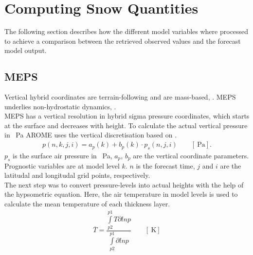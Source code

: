 \section{Computing Snow Quantities} \label{sec:data_proc}
The following section describes how the different model variables where processed to achieve a comparison between the retrieved observed values and the forecast model output. 

\subsection{MEPS}\label{sec:layer_thickness}
Vertical hybrid coordinates are terrain-following and are mass-based, \citep{muller_arome-metcoop:_2017}. %
MEPS underlies non-hydrostatic dynamics, \cite{metcoop_wiki_description_2017}.
\\
MEPS has a vertical resolution in hybrid sigma pressure coordinates, which starts at the surface and decreases with height. To calculate the actual vertical pressure in \SI{}{\Pa} AROME uses the vertical discretisation based on \citet{simmons_energy_1981}. %
\begin{align}
	p(n,k,j,i) = a_p(k) + b_p(k) \cdot p_s(n,j,i) \qquad [\SI{}{\Pa}].
	\label{eq:hybrid_sigma_pressure}
\end{align}
$p_s$ is the surface air pressure in \SI{}{\Pa}, $a_p$, $b_p$ are the vertical coordinate parameters. Prognostic variables are at model level $k$. $n$ is the forecast time, $j$ and $i$ are the latitudal and longitudal grid points, respectively.
\\
The next step was to convert pressure-levels into actual heights with the help of the hypsometric equation. Here, the air temperature in model levels is used to calculate the mean temperature of each thickness layer. 
\begin{align}
	\overline{T} = \dfrac{\int\limits_{p2}^{p1} T \partial ln p}{\int\limits_{p2}^{p1}\partial ln p} \qquad [\SI{}{\kelvin}]
	\label{eq:T_avg}
\end{align}
